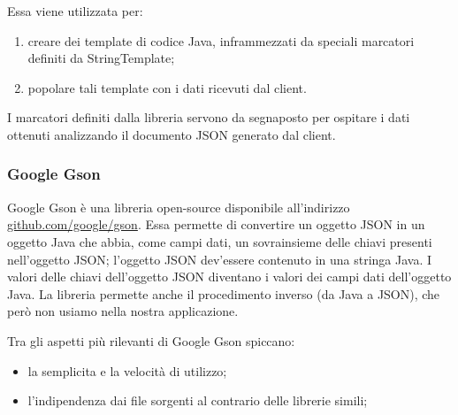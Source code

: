 Essa viene utilizzata per:
\begin{enumerate}
	\item creare dei template di codice Java, inframmezzati da speciali marcatori definiti da StringTemplate;
	\item popolare tali template con i dati ricevuti dal client.
\end{enumerate}
I marcatori definiti dalla libreria servono da segnaposto per ospitare i dati ottenuti analizzando il documento JSON generato dal client.

\subsubsection{Google Gson}
Google Gson è una libreria open-source disponibile all'indirizzo \url{github.com/google/gson}. Essa permette di convertire un oggetto JSON in un oggetto Java che abbia, come campi dati, un sovrainsieme delle chiavi presenti nell'oggetto JSON; l'oggetto JSON dev'essere contenuto in una stringa Java. I valori delle chiavi dell'oggetto JSON diventano i valori dei campi dati dell'oggetto Java. La libreria permette anche il procedimento inverso (da Java a JSON), che però non usiamo nella nostra applicazione.

Tra gli aspetti più rilevanti di Google Gson spiccano:
\begin{itemize}
	\item la semplicita e la velocità di utilizzo;
	\item l'indipendenza dai file sorgenti al contrario delle librerie simili;
\end{itemize}

